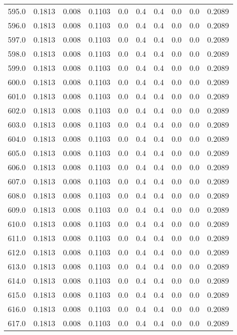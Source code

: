 \begin{longtable}{lrrrrrrrrr}
595.0 & 0.1813 & 0.008 & 0.1103 & 0.0 & 0.4 & 0.4 & 0.0 & 0.0 & 0.2089 \\
596.0 & 0.1813 & 0.008 & 0.1103 & 0.0 & 0.4 & 0.4 & 0.0 & 0.0 & 0.2089 \\
597.0 & 0.1813 & 0.008 & 0.1103 & 0.0 & 0.4 & 0.4 & 0.0 & 0.0 & 0.2089 \\
598.0 & 0.1813 & 0.008 & 0.1103 & 0.0 & 0.4 & 0.4 & 0.0 & 0.0 & 0.2089 \\
599.0 & 0.1813 & 0.008 & 0.1103 & 0.0 & 0.4 & 0.4 & 0.0 & 0.0 & 0.2089 \\
600.0 & 0.1813 & 0.008 & 0.1103 & 0.0 & 0.4 & 0.4 & 0.0 & 0.0 & 0.2089 \\
601.0 & 0.1813 & 0.008 & 0.1103 & 0.0 & 0.4 & 0.4 & 0.0 & 0.0 & 0.2089 \\
602.0 & 0.1813 & 0.008 & 0.1103 & 0.0 & 0.4 & 0.4 & 0.0 & 0.0 & 0.2089 \\
603.0 & 0.1813 & 0.008 & 0.1103 & 0.0 & 0.4 & 0.4 & 0.0 & 0.0 & 0.2089 \\
604.0 & 0.1813 & 0.008 & 0.1103 & 0.0 & 0.4 & 0.4 & 0.0 & 0.0 & 0.2089 \\
605.0 & 0.1813 & 0.008 & 0.1103 & 0.0 & 0.4 & 0.4 & 0.0 & 0.0 & 0.2089 \\
606.0 & 0.1813 & 0.008 & 0.1103 & 0.0 & 0.4 & 0.4 & 0.0 & 0.0 & 0.2089 \\
607.0 & 0.1813 & 0.008 & 0.1103 & 0.0 & 0.4 & 0.4 & 0.0 & 0.0 & 0.2089 \\
608.0 & 0.1813 & 0.008 & 0.1103 & 0.0 & 0.4 & 0.4 & 0.0 & 0.0 & 0.2089 \\
609.0 & 0.1813 & 0.008 & 0.1103 & 0.0 & 0.4 & 0.4 & 0.0 & 0.0 & 0.2089 \\
610.0 & 0.1813 & 0.008 & 0.1103 & 0.0 & 0.4 & 0.4 & 0.0 & 0.0 & 0.2089 \\
611.0 & 0.1813 & 0.008 & 0.1103 & 0.0 & 0.4 & 0.4 & 0.0 & 0.0 & 0.2089 \\
612.0 & 0.1813 & 0.008 & 0.1103 & 0.0 & 0.4 & 0.4 & 0.0 & 0.0 & 0.2089 \\
613.0 & 0.1813 & 0.008 & 0.1103 & 0.0 & 0.4 & 0.4 & 0.0 & 0.0 & 0.2089 \\
614.0 & 0.1813 & 0.008 & 0.1103 & 0.0 & 0.4 & 0.4 & 0.0 & 0.0 & 0.2089 \\
615.0 & 0.1813 & 0.008 & 0.1103 & 0.0 & 0.4 & 0.4 & 0.0 & 0.0 & 0.2089 \\
616.0 & 0.1813 & 0.008 & 0.1103 & 0.0 & 0.4 & 0.4 & 0.0 & 0.0 & 0.2089 \\
617.0 & 0.1813 & 0.008 & 0.1103 & 0.0 & 0.4 & 0.4 & 0.0 & 0.0 & 0.2089 \\

\end{longtable}
